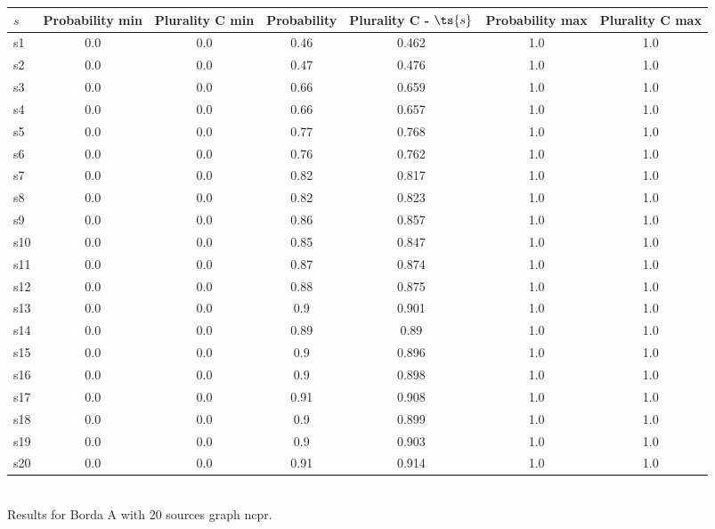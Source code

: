 \documentclass{article}
\begin{document}
\noindent\begin{tabular}{|l|c|c|c|c|c|c|}
\hline
$s$& Probability min & Plurality C min & Probability & Plurality C - $\ts{s}$ & Probability max & Plurality C max\\
\hline
s1 &0.0 & 0.0 & 0.46 & 0.462 & 1.0 & 1.0\\
\hline
s2 &0.0 & 0.0 & 0.47 & 0.476 & 1.0 & 1.0\\
\hline
s3 &0.0 & 0.0 & 0.66 & 0.659 & 1.0 & 1.0\\
\hline
s4 &0.0 & 0.0 & 0.66 & 0.657 & 1.0 & 1.0\\
\hline
s5 &0.0 & 0.0 & 0.77 & 0.768 & 1.0 & 1.0\\
\hline
s6 &0.0 & 0.0 & 0.76 & 0.762 & 1.0 & 1.0\\
\hline
s7 &0.0 & 0.0 & 0.82 & 0.817 & 1.0 & 1.0\\
\hline
s8 &0.0 & 0.0 & 0.82 & 0.823 & 1.0 & 1.0\\
\hline
s9 &0.0 & 0.0 & 0.86 & 0.857 & 1.0 & 1.0\\
\hline
s10 &0.0 & 0.0 & 0.85 & 0.847 & 1.0 & 1.0\\
\hline
s11 &0.0 & 0.0 & 0.87 & 0.874 & 1.0 & 1.0\\
\hline
s12 &0.0 & 0.0 & 0.88 & 0.875 & 1.0 & 1.0\\
\hline
s13 &0.0 & 0.0 & 0.9 & 0.901 & 1.0 & 1.0\\
\hline
s14 &0.0 & 0.0 & 0.89 & 0.89 & 1.0 & 1.0\\
\hline
s15 &0.0 & 0.0 & 0.9 & 0.896 & 1.0 & 1.0\\
\hline
s16 &0.0 & 0.0 & 0.9 & 0.898 & 1.0 & 1.0\\
\hline
s17 &0.0 & 0.0 & 0.91 & 0.908 & 1.0 & 1.0\\
\hline
s18 &0.0 & 0.0 & 0.9 & 0.899 & 1.0 & 1.0\\
\hline
s19 &0.0 & 0.0 & 0.9 & 0.903 & 1.0 & 1.0\\
\hline
s20 &0.0 & 0.0 & 0.91 & 0.914 & 1.0 & 1.0\\
\hline
\end{tabular}\\

\noindent Results for Borda A with 20 sources graph ncpr.
\end{document}
